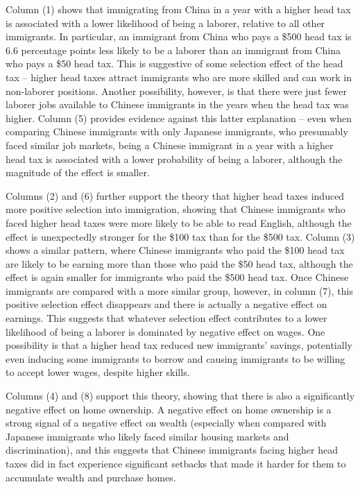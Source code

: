 \documentclass[12pt]{article}
\begin{document}
Column (1) shows that immigrating from China in a year with a higher head tax is associated with a lower likelihood of being a laborer, relative to all other immigrants. In particular, an immigrant from China who pays a \$500 head tax is 6.6 percentage points less likely to be a laborer than an immigrant from China who pays a \$50 head tax. This is suggestive of some selection effect of the head tax -- higher head taxes attract immigrants who are more skilled and can work in non-laborer positions. Another possibility, however, is that there were just fewer laborer jobs available to Chinese immigrants in the years when the head tax was higher. 
Column (5) provides evidence against this latter explanation -- even when comparing Chinese immigrants with only Japanese immigrants, who presumably faced similar job markets, being a Chinese immigrant in a year with a higher head tax is associated with a lower probability of being a laborer, although the magnitude of the effect is smaller.

Columns (2) and (6) further support the theory that higher head taxes induced more positive selection into immigration, showing that Chinese immigrants who faced higher head taxes were more likely to be able to read English, although the effect is unexpectedly stronger for the \$100 tax than for the \$500 tax. Column (3) shows a similar pattern, where Chinese immigrants who paid the \$100 head tax are likely to be earning more than those who paid the \$50 head tax, although the effect is again smaller for immigrants who paid the \$500 head tax. Once Chinese immigrants are compared with a more similar group, however, in column (7), this positive selection effect disappears and there is actually a negative effect on earnings. This suggests that whatever selection effect contributes to a lower likelihood of being a laborer is dominated by negative effect on wages. 
One possibility is that a higher head tax reduced new immigrants' savings, potentially even inducing some immigrants to borrow and causing immigrants to be willing to accept lower wages, despite higher skills.

Columns (4) and (8) support this theory, showing that there is also a significantly negative effect on home ownership. A negative effect on home ownership is a strong signal of a negative effect on wealth (especially when compared with Japanese immigrants who likely faced similar housing markets and discrimination), and this suggests that Chinese immigrants facing higher head taxes did in fact experience significant setbacks that made it harder for them to accumulate wealth and purchase homes.
\end{document}
